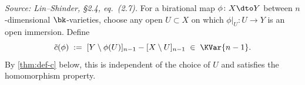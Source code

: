 \begin{definition}
  \label{def:c-tilde}
  \textit{Source: Lin--Shinder, §2.4, eq.~(2.7).}
  For a birational map \(\phi \colon X \dto Y\) between \(n\)-dimensional
  \(\bk\)-varieties, choose any open \(U \subset X\) on which \(\phi|_U \colon U \to Y\)
  is an open immersion.  Define
  \[
    \tilde{c}(\phi) \;:=\; [Y \setminus \phi(U)]_{n-1} - [X \setminus U]_{n-1}
    \;\in\; \KVar{n-1}.
  \]
  By \cref{thm:def-c} below, this is independent of the choice of \(U\) and
  satisfies the homomorphism property.
\end{definition}

